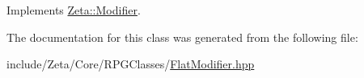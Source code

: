 Implements \hyperlink{classZeta_1_1Modifier_a43bf640dc0ed6404e42469f073759b32}{Zeta\+::\+Modifier}.



The documentation for this class was generated from the following file\+:\begin{DoxyCompactItemize}
\item 
include/\+Zeta/\+Core/\+R\+P\+G\+Classes/\hyperlink{FlatModifier_8hpp}{Flat\+Modifier.\+hpp}\end{DoxyCompactItemize}
